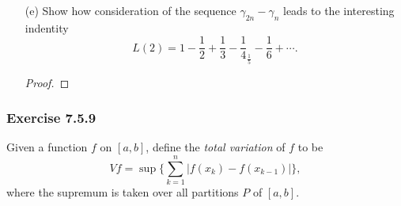 \begin{enumerate}
\begin{proof}
		\end{proof}
	\item[(e)] Show how consideration of the sequence \( \gamma_{2n} - \gamma_{n}    \) leads to the interesting indentity 
		\[  L(2) = 1 - \frac{ 1 }{ 2 } + \frac{ 1 }{ 3 } - \frac{ 1 }{ 4 } _ \frac{ 1 }{ 5 } - \frac{ 1 }{ 6 } + \dotsb.  \]
		\begin{proof}
		
		\end{proof}
\end{enumerate}



\subsubsection{Exercise 7.5.9} Given a function \( f  \) on \( [a,b]  \), define the \textit{total variation} of \( f  \) to be 
\[  Vf = \sup \Bigg\{ \sum_{ k=1 }^{ n } | f(x_{k}) - f(x_{k-1}) |  \Bigg\},  \]
where the supremum is taken over all partitions \( P  \) of \( [a,b] \).
